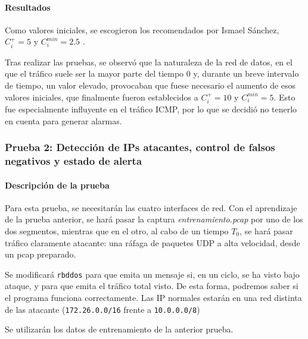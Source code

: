 \paragraph{Resultados}\mbox{}

Como valores iniciales, se escogieron los recomendados por Ismael Sánchez, $C_i^+=5$ y $C_i^{min}=2.5$
 \cite{CUSUM_Carlos_III}.

Tras realizar las pruebas, se observó que la naturaleza de la red de datos, en el que el tráfico suele ser la 
mayor parte del tiempo $0$ y, durante un breve intervalo de tiempo, un valor elevado, provocaban que fuese necesario
el aumento de esos valores iniciales, que finalmente fueron establecidos a $C_i^+=10$ y $C_i^{min}=5$. Esto fue
especialmente influyente en el tráfico \gls{ICMP}, por lo que se decidió no tenerlo en cuenta para generar alarmas.

\subsubsection{Prueba 2: Detección de IPs atacantes, control de falsos negativos y estado de 
alerta}
\paragraph{Descripción de la prueba}\mbox{}

Para esta prueba, se necesitarán las cuatro interfaces de red. Con el aprendizaje de la prueba anterior, se hará pasar 
la captura \emph{entrenamiento.pcap} por uno de los dos segmentos, mientras que en el otro, al cabo de un tiempo $T_0$, 
se hará pasar tráfico claramente atacante: una ráfaga de paquetes UDP a alta velocidad, desde un pcap preparado.

Se modificará \texttt{rbddos} para que emita un mensaje si, en un ciclo, se ha visto bajo ataque, y para que emita el 
tráfico total visto. De esta forma, podremos saber si el programa funciona correctamente. Las IP normales estarán en 
una red distinta de las atacante (\texttt{172.26.0.0/16} frente a \texttt{10.0.0.0/8})

Se utilizarán los datos de entrenamiento de la anterior prueba.

\endinput

\paragraph{Procedimiento}
Se arranca el programa, ya en modo defensa por los datos aprendidos
\begin{verbatim}
[root@DUT rbddos]# ./rbddos -i eth4 -o eth7 -c 99 -r 0 -g 1:2:3:4:5:6  -m 7 -d -s 1024 -l /var/log/ddos.log.*
\end{verbatim}

